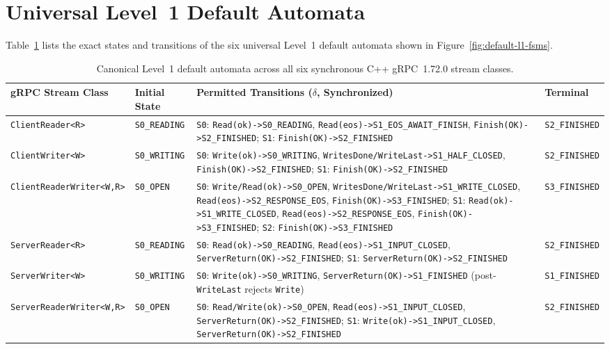 \section{Universal Level~1 Default Automata}
\label{app:reference-tables}

Table~\ref{tab:default-l1} lists the exact states and transitions of the six universal Level~1 default automata shown in Figure~\ref{fig:default-l1-fsms}.

\begin{table}[htbp]
\centering
\footnotesize
\setlength{\tabcolsep}{3pt}
\renewcommand{\arraystretch}{1.12}
\begin{tabular*}{\textwidth}{@{\extracolsep{\fill}}>{\raggedright\arraybackslash}p{}>{\raggedright\arraybackslash}p{}>{\raggedright\arraybackslash}p{}>{\raggedright\arraybackslash}p{}@{}}
\toprule
\textbf{gRPC Stream Class} & \textbf{Initial State} & \textbf{Permitted Transitions ($\delta$, Synchronized)} & \textbf{Terminal} \\
\midrule
\texttt{ClientReader<R>} & \texttt{S0\_READING} & \texttt{S0}: \texttt{Read(ok)->S0\_READING}, \texttt{Read(eos)->S1\_EOS\_AWAIT\_FINISH}, \texttt{Finish(OK)->S2\_FINISHED}; \texttt{S1}: \texttt{Finish(OK)->S2\_FINISHED} & \texttt{S2\_FINISHED} \\
\texttt{ClientWriter<W>} & \texttt{S0\_WRITING} & \texttt{S0}: \texttt{Write(ok)->S0\_WRITING}, \texttt{WritesDone/WriteLast->S1\_HALF\_CLOSED}, \texttt{Finish(OK)->S2\_FINISHED}; \texttt{S1}: \texttt{Finish(OK)->S2\_FINISHED} & \texttt{S2\_FINISHED} \\
\texttt{ClientReaderWriter<W,R>} & \texttt{S0\_OPEN} & \texttt{S0}: \texttt{Write/Read(ok)->S0\_OPEN}, \texttt{WritesDone/WriteLast->S1\_WRITE\_CLOSED}, \texttt{Read(eos)->S2\_RESPONSE\_EOS}, \texttt{Finish(OK)->S3\_FINISHED}; \texttt{S1}: \texttt{Read(ok)->S1\_WRITE\_CLOSED}, \texttt{Read(eos)->S2\_RESPONSE\_EOS}, \texttt{Finish(OK)->S3\_FINISHED}; \texttt{S2}: \texttt{Finish(OK)->S3\_FINISHED} & \texttt{S3\_FINISHED} \\
\texttt{ServerReader<R>} & \texttt{S0\_READING} & \texttt{S0}: \texttt{Read(ok)->S0\_READING}, \texttt{Read(eos)->S1\_INPUT\_CLOSED}, \texttt{ServerReturn(OK)->S2\_FINISHED}; \texttt{S1}: \texttt{ServerReturn(OK)->S2\_FINISHED} & \texttt{S2\_FINISHED} \\
\texttt{ServerWriter<W>} & \texttt{S0\_WRITING} & \texttt{S0}: \texttt{Write(ok)->S0\_WRITING}, \texttt{ServerReturn(OK)->S1\_FINISHED} (post-\texttt{WriteLast} rejects \texttt{Write}) & \texttt{S1\_FINISHED} \\
\texttt{ServerReaderWriter<W,R>} & \texttt{S0\_OPEN} & \texttt{S0}: \texttt{Read/Write(ok)->S0\_OPEN}, \texttt{Read(eos)->S1\_INPUT\_CLOSED}, \texttt{ServerReturn(OK)->S2\_FINISHED}; \texttt{S1}: \texttt{Write(ok)->S1\_INPUT\_CLOSED}, \texttt{ServerReturn(OK)->S2\_FINISHED} & \texttt{S2\_FINISHED} \\
\bottomrule
\end{tabular*}
\caption{Canonical Level~1 default automata across all six synchronous C++ gRPC~1.72.0 stream classes.}
\label{tab:default-l1}
\end{table}
